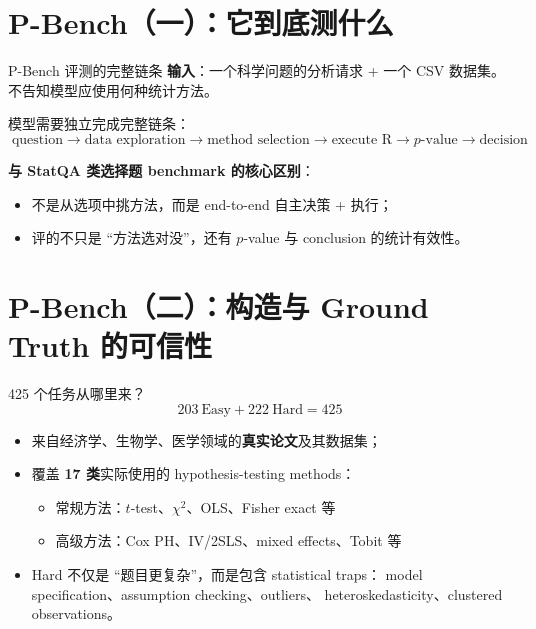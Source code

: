\documentclass[aspectratio=169]{ctexbeamer}
\begin{document}
\section{P-Bench（一）：它到底测什么}

\begin{frame}{P-Bench 评测的完整链条}
  \textbf{输入}：一个科学问题的分析请求 + 一个 CSV 数据集。
  \alert{不告知模型应使用何种统计方法。}

  \medskip
  模型需要独立完成完整链条：
  \[
    \boxed{\;\text{question} \rightarrow \text{data exploration}
      \rightarrow \text{method selection} \rightarrow \text{execute R}
      \rightarrow p\text{-value} \rightarrow \text{decision}\;}
  \]

  \medskip
  \textbf{与 StatQA 类选择题 benchmark 的核心区别}：
  \begin{itemize}
    \item 不是从选项中挑方法，而是 end-to-end 自主决策 + 执行；
    \item 评的不只是 ``方法选对没''，还有 $p$-value 与 conclusion 的统计有效性。
  \end{itemize}
\end{frame}

\section{P-Bench（二）：构造与 Ground Truth 的可信性}

\begin{frame}{425 个任务从哪里来？}
  \[
    203\ \text{Easy} + 222\ \text{Hard} = \boxed{425}
  \]

  \begin{itemize}
    \item 来自经济学、生物学、医学领域的\textbf{真实论文}及其数据集；
    \item 覆盖 \textbf{17 类}实际使用的 hypothesis-testing methods：
      \begin{itemize}
        \item 常规方法：$t$-test、$\chi^2$、OLS、Fisher exact 等
        \item 高级方法：Cox PH、IV/2SLS、mixed effects、Tobit 等
      \end{itemize}
    \item Hard 不仅是 ``题目更复杂''，而是包含 statistical traps：
      model specification、assumption checking、outliers、
      heteroskedasticity、clustered observations。
  \end{itemize}
\end{frame}
\end{document}
